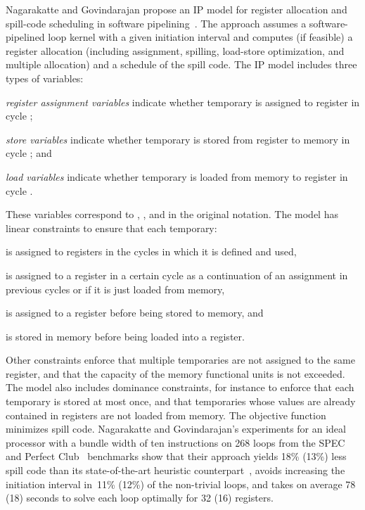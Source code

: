 \documentclass[acmsmall,authorversion,nonacm]{acmart}
\newcommand{\var}[2]{}
\begin{document}
Nagarakatte and Govindarajan propose an IP model for register
allocation and spill-code scheduling in software
pipelining~\cite{Nagarakatte2007}.
The approach assumes a software-pipelined loop kernel with a given
initiation interval and computes (if feasible) a register allocation
(including assignment, spilling, load-store optimization, and multiple
allocation) and a schedule of the spill code.
The IP model includes three types of variables:
\begin{inparaitem}[]
\item \emph{register assignment variables} \var{a}{t,r,k}
  indicate whether temporary  is assigned to register
   in cycle ;
\item \emph{store variables} \var{s}{t,r,k} indicate
  whether temporary  is stored from register  to
  memory in cycle ; and
\item \emph{load variables} \var{l}{t,r,k} indicate
  whether temporary  is loaded from memory to register
   in cycle .
\end{inparaitem}
These variables correspond to , , and
 in the original notation.
The model has linear constraints to ensure that each temporary:
\begin{inparaitem}[]
\item is assigned to registers in the cycles in which it is defined
  and used,
\item is assigned to a register in a certain cycle as a continuation
  of an assignment in previous cycles or if it is just loaded from
  memory,
\item is assigned to a register before being stored to memory, and
\item is stored in memory before being loaded into a register.
\end{inparaitem}
Other constraints enforce that multiple temporaries are not assigned
to the same register, and that the capacity of the memory functional
units is not exceeded.
The model also includes dominance constraints, for instance to enforce
that each temporary is stored at most once, and that temporaries whose
values are already contained in registers are not loaded from memory.
The objective function minimizes spill code.
Nagarakatte and Govindarajan's experiments for an ideal processor with
a bundle width of ten instructions on 268 loops from the
SPEC~\cite{CPU} and Perfect Club~\cite{Berry1988} benchmarks show that
their approach yields 18\% (13\%) less spill code than its
state-of-the-art heuristic counterpart~\cite{Zalamea2000}, avoids
increasing the initiation interval in~11\% (12\%) of the non-trivial
loops, and takes on average 78 (18) seconds to solve each loop
optimally for 32 (16) registers.
\end{document}
